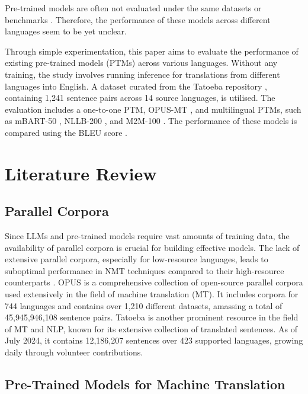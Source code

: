\documentclass[a4paper]{article}
\begin{document}
Pre-trained models are often not evaluated under the same datasets or benchmarks \cite{liu-2020-mbart,nllb200-2020,fan-2020-m2m100,wei-2023-polylm}. Therefore, the performance of these models across different languages seem to be yet unclear.

Through simple experimentation, this paper aims to evaluate the performance of existing pre-trained models (PTMs) across various languages. Without any training, the study involves running inference for translations from different languages into English. A dataset curated from the Tatoeba repository \cite{tatoeba}, containing 1,241 sentence pairs across 14 source languages, is utilised. The evaluation includes a one-to-one PTM, OPUS-MT \cite{tiedemann-2020-opus-mt}, and multilingual PTMs, such as mBART-50 \cite{liu-2020-mbart}, NLLB-200 \cite{nllb200-2020}, and M2M-100 \cite{fan-2020-m2m100}. The performance of these models is compared using the BLEU score \cite{papieni-2002-bleu}.


\section{Literature Review}

\subsection{Parallel Corpora}

Since LLMs and pre-trained models require vast amounts of training data, the availability of parallel corpora is crucial for building effective models. The lack of extensive parallel corpora, especially for low-resource languages, leads to suboptimal performance in NMT techniques compared to their high-resource counterparts \cite{ranathunga-2023-nmt-low-res}. OPUS \cite{opus} is a comprehensive collection of open-source parallel corpora used extensively in the field of machine translation (MT). It includes corpora for 744 languages and contains over 1,210 different datasets, amassing a total of 45,945,946,108 sentence pairs. Tatoeba \cite{tatoeba} is another prominent resource in the field of MT and NLP, known for its extensive collection of translated sentences. As of July 2024, it contains 12,186,207 sentences over 423 supported languages, growing daily through volunteer contributions.

\subsection{Pre-Trained Models for Machine Translation}
\end{document}
